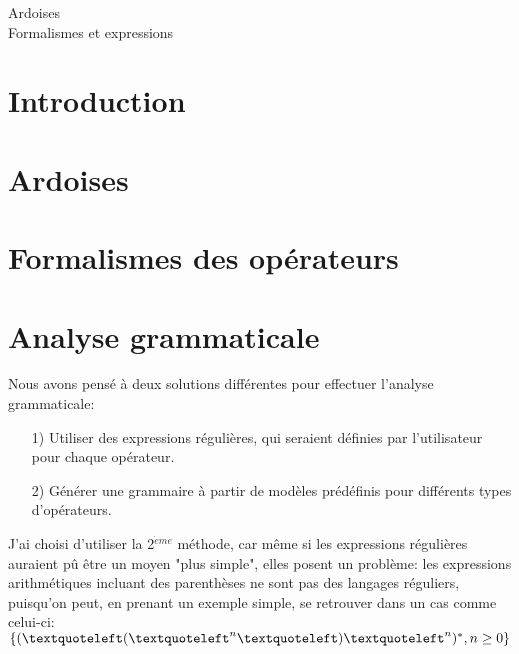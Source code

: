 \documentclass{article}
\begin{document}
\begin{center}
	\huge 
	Ardoises \\
	Formalismes et expressions
\end{center}
\renewcommand{\contentsname}{Sommaire}
\tableofcontents
\newpage

\section{Introduction}
\section{Ardoises}
\section{Formalismes des opérateurs}
\section{Analyse grammaticale}
Nous avons pensé à deux solutions différentes pour effectuer l'analyse grammaticale:
\begin{enumerate}
	\item[1)] Utiliser des expressions régulières, qui seraient définies par l'utilisateur pour chaque opérateur.
	\item[2)] Générer une grammaire à partir de modèles prédéfinis pour différents types d'opérateurs.
\end{enumerate}
J'ai choisi d'utiliser la 2$^{\grave{e}me}$ méthode, car même si les expressions régulières auraient pû être un moyen "plus simple", elles posent un problème: les expressions arithmétiques incluant des parenthèses ne sont pas des langages réguliers, puisqu'on peut, en prenant un exemple simple, se retrouver dans un cas comme celui-ci: $\{(\textquoteleft(\textquoteleft^{n}\textquoteleft)\textquoteleft^{n})^{*}, n \ge 0 \}$
\end{document}
